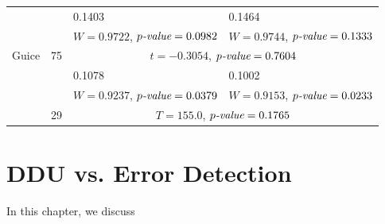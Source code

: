 \documentclass[twoside,a4paper,11pt]{memoir}
\begin{document}
\begin{table}[]
\begin{adjustbox}{center}
\begin{tabular}{llll}
 &  & 0.1403 & 0.1464 \\
 &  & $W = 0.9722$, $p\emph{-value} = 0.0982$ & $W = 0.9744$, $p\emph{-value} = 0.1333$ \\
\multirow{-3}{*}{Guice} & \multirow{-3}{*}{75} & \multicolumn{2}{c}{$t = -0.3054$, $p\emph{-value} = 0.7604$} \\
\rowcolor{Gray}
\cellcolor{Gray} & \cellcolor{Gray} & 0.1078 & 0.1002 \\
\rowcolor{Gray}
\cellcolor{Gray} & \cellcolor{Gray} & $W = 0.9237$, $p\emph{-value} = 0.0379$ & $W = 0.9153$, $p\emph{-value} = 0.0233$ \\
\rowcolor{Gray}
\multirow{-3}{*}{\cellcolor{Gray}Jsoup} & \multirow{-3}{*}{\cellcolor{Gray}29} & \multicolumn{2}{c}{\cellcolor{Gray}$T = 155.0$, $p\emph{-value} = 0.1765$}\\
\bottomrule
\end{tabular}
\end{adjustbox}
\end{table}

\chapter{DDU vs. Error Detection}
\label{ch:rq3}
In this chapter, we discuss
\end{document}
